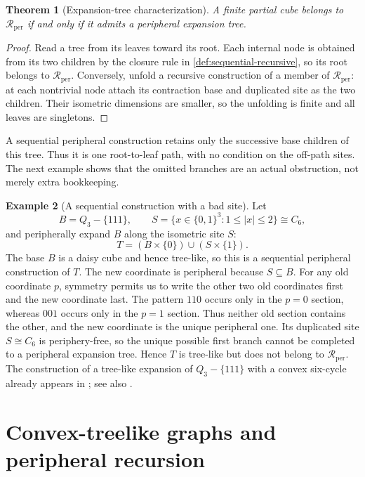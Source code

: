 \documentclass[11pt]{article}
\newtheorem{theorem}{Theorem}[section]
\theoremstyle{definition}
\newtheorem{example}[theorem]{Example}
\theoremstyle{remark}
\newcommand{\Rper}{\mathcal R_{\mathrm{per}}}
\begin{document}
\begin{theorem}[Expansion-tree characterization]
\label{thm:expansion-tree}
A finite partial cube belongs to \(\Rper\) if and only if it admits a
peripheral expansion tree.
\end{theorem}

\begin{proof}
Read a tree from its leaves toward its root.  Each internal node is obtained
from its two children by the closure rule in
\cref{def:sequential-recursive}, so its root belongs to \(\Rper\).
Conversely, unfold a recursive construction of a member of \(\Rper\): at
each nontrivial node attach its contraction base and duplicated site as the
two children.  Their isometric dimensions are smaller, so the unfolding is
finite and all leaves are singletons.
\end{proof}

A sequential peripheral construction retains only the successive base
children of this tree.  Thus it is one root-to-leaf path, with no condition
on the off-path sites.  The next example shows that the omitted branches are
an actual obstruction, not merely extra bookkeeping.

\begin{example}[A sequential construction with a bad site]
\label{ex:tree-like-not-recursive}
Let
\[
 B=Q_3-\{111\},\qquad
 S=\{x\in\{0,1\}^3:1\le |x|\le2\}\cong C_6,
\]
and peripherally expand \(B\) along the isometric site \(S\):
\[
 T=(B\times\{0\})\cup(S\times\{1\}).
\]
The base \(B\) is a daisy cube and hence tree-like, so this is a sequential
peripheral construction of \(T\).  The new coordinate is peripheral because
\(S\subseteq B\).  For any old coordinate \(p\), symmetry permits us to
write the other two old coordinates first and the new coordinate last.  The
pattern \(110\) occurs only in the \(p=0\) section, whereas \(001\) occurs
only in the \(p=1\) section.  Thus neither old section contains the other,
and the new coordinate is the unique peripheral one.  Its duplicated site
\(S\cong C_6\) is periphery-free, so the unique possible first branch cannot
be completed to a peripheral expansion tree.  Hence \(T\) is tree-like but
does not belong to \(\Rper\). The construction of a tree-like expansion
of \(Q_3-\{111\}\) with a convex six-cycle already appears in
\cite[Figure~2 and the discussion after Definition~5.5]{Polat12treelike};
see also \cite[Figure~2]{Gologranc14treehamming}.
\end{example}

\section{Convex-treelike graphs and peripheral recursion}
\label{sec:convex-characterization}
\end{document}
